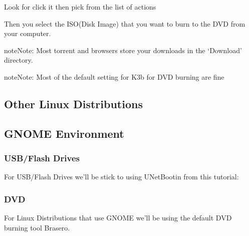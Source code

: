 \documentclass[letterpaper,10pt,english]{sphinxmanual}
\begin{document}
Look for  click it then pick  from the list of actions


Then you select the ISO(Disk Image) that you want to burn to the DVD from your computer.

\begin{sphinxadmonition}{note}{Note:}
Most torrent and browsers store your downloads in the ‘Download’ directory.
\end{sphinxadmonition}

\begin{sphinxadmonition}{note}{Note:}
Most of the default setting for K3b for DVD burning are fine
\end{sphinxadmonition}


\subsection{Other Linux Distributions}
\label{\detokenize{docs/installation:other-linux-distributions}}

\subsection{GNOME Environment}
\label{\detokenize{docs/installation:gnome-environment}}

\subsubsection{USB/Flash Drives}
\label{\detokenize{docs/installation:id3}}
For USB/Flash Drives we’ll be stick to using UNetBootin from this tutorial: {\hyperref[\detokenize{docs/installation:usb-drives-link}]{}}


\subsubsection{DVD}
\label{\detokenize{docs/installation:id4}}

For Linux Distributions that use GNOME we’ll be using the default DVD burning tool Brasero.
\end{document}
